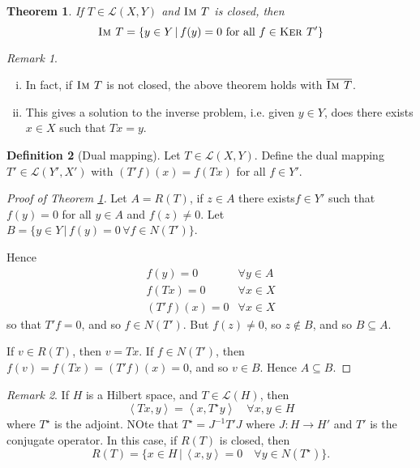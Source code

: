 \documentclass[10pt, oneside, reqno]{amsart}
\theoremstyle{plain}%
\newtheorem{thm}{Theorem}[section]
\numberwithin{equation}{section}
\theoremstyle{definition}
\newtheorem{defn}[thm]{Definition}
\theoremstyle{remark}
\newtheorem*{rem}{Remark}
\newcommand{\given}{ \, | \,}
\newcommand{\El}{\mathcal{L}}
\newcommand{\im}{\textsc{Im\ }}
\renewcommand{\ker}{\textsc{Ker\ }}
\newcommand{\iprod}[1]{\left\langle #1 \right\rangle}
\begin{document}
\begin{thm}
    \label{thm:rangeclosed}
    If $T \in \El(X, Y)$ and $\im T$ is closed, then \[
        \im T = \{ y \in Y \given f(y) = 0 \text{ for all } f \in \ker T' \}
    \] 
\end{thm}

\begin{rem}{\ } 
    \begin{enumerate}[(i)]
        \item In fact, if $\im T$ is not closed, the above theorem holds with $\overline{\im T}$. 
        \item This gives a solution to the inverse problem, i.e. given $y \in Y$, does there exists $x \in X$ such that $Tx = y$.   
    \end{enumerate}
\end{rem}

\begin{defn}[Dual mapping]
    Let $T \in \El(X, Y)$. Define the dual mapping $T' \in \El(Y', X')$ with $(T'f)(x) = f(Tx)$ for all $f \in Y'$.  
\end{defn}

\begin{proof}[Proof of Theorem \ref{thm:rangeclosed}]
    Let $A = R(T)$, if $z \in A$ there exists$f \in Y'$ such that $f(y) = 0$ for all $y \in A$ and $f(z) \neq 0$.  Let $B = \{ y \in Y \given f(y) = 0 \, \forall f \in N(T') \}$.  
    
    Hence \begin{align*}
        f(y) = 0 &\forall y \in A \\
        f(Tx) = 0 &\forall x \in X \\
        (T'f)(x) = 0 &\forall x \in X
    \end{align*} so that $T'f = 0$, and so $f \in N(T')$.  But $f(z) \neq 0$, so $z \notin B$, and so $B \subseteq A$.  
    
    If $v \in R(T)$, then $v = Tx$.  If $f \in N(T')$, then $f(v) = f(Tx) = (T'f)(x) = 0$, and so $v \in B$.  Hence $A \subseteq B$.  \qedhere
\end{proof}

\begin{rem}
    If $H$ is a Hilbert space, and $T \in \mathcal L(H)$, then \[
        \iprod{Tx, y} = \iprod{x, T^\star y} \quad \forall x, y \in H
    \] where $T^\star$ is the adjoint.  NOte that $T^\star = J^{-1} T' J$ where $J: H \rightarrow H'$ and $T'$ is the conjugate operator.  In this case, if $R(T)$ is closed, then \[
        R(T) = \{ x \in H \given \iprod{x, y} = 0 \quad \forall y \in N(T^\star) \}.
    \]
\end{rem}
\end{document}
